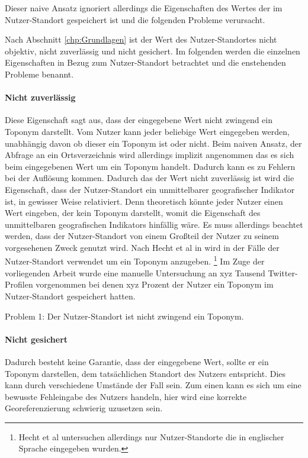 			Dieser naive Ansatz ignoriert allerdings die Eigenschaften des Wertes der im Nutzer-Standort gespeichert ist und die folgenden Probleme verursacht.

			Nach Abschnitt \ref{chp:Grundlagen} ist der Wert des Nutzer-Standortes nicht objektiv, nicht zuverlässig und nicht gesichert. 
			Im folgenden werden die einzelnen Eigenschaften in Bezug zum Nutzer-Standort betrachtet und die enstehenden Probleme benannt.
			
			\paragraph{Nicht zuverlässig} 
				
				Diese Eigenschaft sagt aus, dass der eingegebene Wert nicht zwingend ein Toponym darstellt.
				Vom Nutzer kann jeder beliebige Wert eingegeben werden, unabhängig davon ob dieser ein Toponym ist oder nicht.
				Beim naiven Ansatz, der Abfrage an ein Ortsverzeichnis wird allerdings implizit angenommen das es sich beim eingegebenen Wert um ein Toponym handelt.
				Dadurch kann es zu Fehlern bei der Auflösung kommen.
				Dadurch das der Wert nicht zuverlässig ist wird die Eigenschaft, dass der Nutzer-Standort ein unmittelbarer geografischer Indikator ist, in gewisser Weise relativiert.
				Denn theoretisch könnte jeder Nutzer einen Wert eingeben, der kein Toponym darstellt, womit die Eigenschaft des unmittelbaren geografischen Indikators hinfällig wäre.
				Es muss allerdings beachtet werden, dass der Nutzer-Standort von einem Großteil der Nutzer zu seinem vorgesehenen Zweck genutzt wird.
				Nach Hecht et al in \cite{Hecht2011} wird in  der Fälle der Nutzer-Standort verwendet um ein Toponym anzugeben. \footnote{Hecht et al untersuchen allerdings nur Nutzer-Standorte die in englischer Sprache eingegeben wurden.}
				Im Zuge der vorliegenden Arbeit wurde eine manuelle Untersuchung an xyz Tausend Twitter-Profilen vorgenommen bei denen xyz Prozent der Nutzer ein Toponym im Nutzer-Standort gespeichert hatten.   


				Problem 1: Der Nutzer-Standort ist nicht zwingend ein Toponym.

			\paragraph{Nicht gesichert} 

				Dadurch besteht keine Garantie, dass der eingegebene Wert, sollte er ein Toponym darstellen, dem tatsächlichen Standort des Nutzers entspricht. 
				Dies kann durch verschiedene Umstände der Fall sein.
				Zum einen kann es sich um eine bewusste Fehleingabe des Nutzers handeln, hier wird eine korrekte Georeferenzierung schwierig uzusetzen sein.

